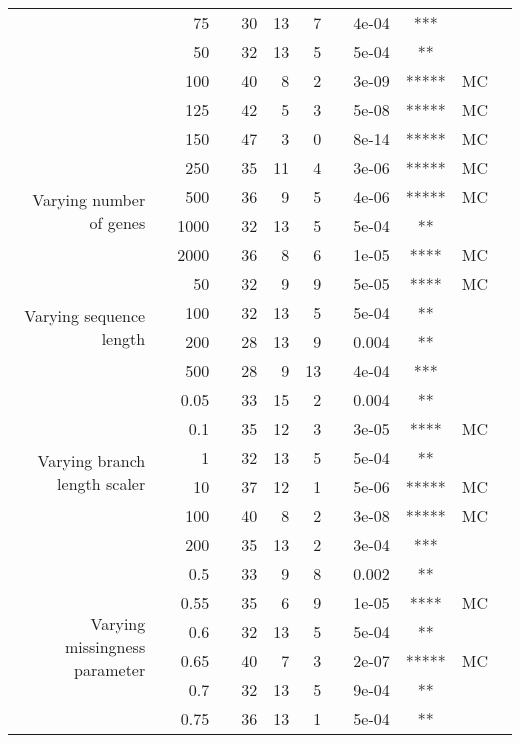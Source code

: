 \begin{table}[!h]
\begin{tabular}{r r r l r r r l c c c l}
   & & 75 & & 30 & 13 & 7 & & 4e-04 & *** &  &  \\
   & & 50 & & 32 & 13 & 5 & & 5e-04 & ** &  &  \\
   & & 100 & & 40 & 8 & 2 & & 3e-09 & ***** & MC &  \\
   & & 125 & & 42 & 5 & 3 & & 5e-08 & ***** & MC &  \\
   & & 150 & & 47 & 3 & 0 & & 8e-14 & ***** & MC &  \\
\midrule
\multirow{ 4}{2cm}{Varying number of genes}
   & & 250 & & 35 & 11 & 4 & & 3e-06 & ***** & MC &  \\
   & & 500 & & 36 & 9 & 5 & & 4e-06 & ***** & MC &  \\
   & & 1000 & & 32 & 13 & 5 & & 5e-04 & ** &  &  \\
   & & 2000 & & 36 & 8 & 6 & & 1e-05 & **** & MC &  \\
\midrule
\multirow{ 4}{2cm}{Varying sequence length}
   & & 50 & & 32 & 9 & 9 & & 5e-05 & **** & MC &  \\
   & & 100 & & 32 & 13 & 5 & & 5e-04 & ** &  &  \\
   & & 200 & & 28 & 13 & 9 & & 0.004 & ** &  &  \\
   & & 500 & & 28 & 9 & 13 & & 4e-04 & *** &  &  \\
\midrule
\multirow{ 6}{2cm}{Varying branch length scaler}
   & & 0.05 & & 33 & 15 & 2 & & 0.004 & ** &  &  \\
   & & 0.1 & & 35 & 12 & 3 & & 3e-05 & **** & MC &  \\
   & & 1 & & 32 & 13 & 5 & & 5e-04 & ** &  &  \\
   & & 10 & & 37 & 12 & 1 & & 5e-06 & ***** & MC &  \\
   & & 100 & & 40 & 8 & 2 & & 3e-08 & ***** & MC &  \\
   & & 200 & & 35 & 13 & 2 & & 3e-04 & *** &  &  \\
\midrule
\multirow{ 6}{2cm}{Varying missingness parameter}
   & & 0.5 & & 33 & 9 & 8 & & 0.002 & ** &  &  \\
   & & 0.55 & & 35 & 6 & 9 & & 1e-05 & **** & MC &  \\
   & & 0.6 & & 32 & 13 & 5 & & 5e-04 & ** &  &  \\
   & & 0.65 & & 40 & 7 & 3 & & 2e-07 & ***** & MC &  \\
   & & 0.7 & & 32 & 13 & 5 & & 9e-04 & ** &  &  \\
   & & 0.75 & & 36 & 13 & 1 & & 5e-04 & ** &  &  \\
\bottomrule
\end{tabular}
\end{table}

